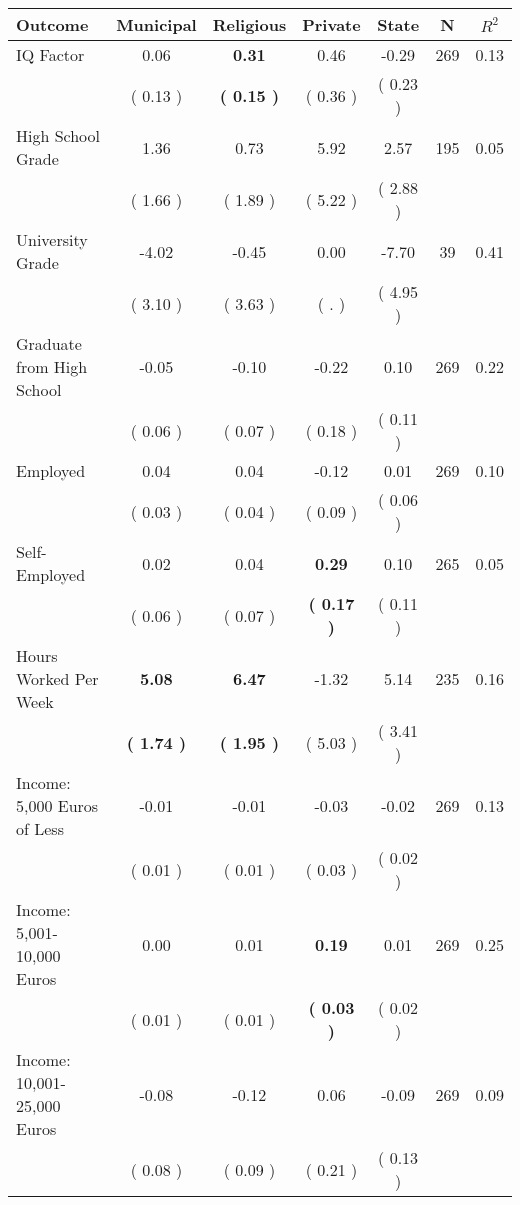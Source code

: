 \begin{tabular}{lcccccc}
\toprule
 \textbf{Outcome} & \textbf{Municipal} & \textbf{Religious} & \textbf{Private} & \textbf{State} & \textbf{N} & \textbf{$ R^2$} \\
\midrule
IQ Factor &      0.06 & \textbf{     0.31} &      0.46 &     -0.29 & 269 &      0.13 \\ 
 & (     0.13 ) & \textbf{(     0.15 )} & (     0.36 ) & (     0.23 ) & \\
High School Grade &      1.36 &      0.73 &      5.92 &      2.57 & 195 &      0.05 \\ 
 & (     1.66 ) & (     1.89 ) & (     5.22 ) & (     2.88 ) & \\
University Grade &     -4.02 &     -0.45 &      0.00 &     -7.70 & 39 &      0.41 \\ 
 & (     3.10 ) & (     3.63 ) & (        . ) & (     4.95 ) & \\
Graduate from High School &     -0.05 &     -0.10 &     -0.22 &      0.10 & 269 &      0.22 \\ 
 & (     0.06 ) & (     0.07 ) & (     0.18 ) & (     0.11 ) & \\
Employed &      0.04 &      0.04 &     -0.12 &      0.01 & 269 &      0.10 \\ 
 & (     0.03 ) & (     0.04 ) & (     0.09 ) & (     0.06 ) & \\
Self-Employed &      0.02 &      0.04 & \textbf{     0.29} &      0.10 & 265 &      0.05 \\ 
 & (     0.06 ) & (     0.07 ) & \textbf{(     0.17 )} & (     0.11 ) & \\
Hours Worked Per Week & \textbf{     5.08} & \textbf{     6.47} &     -1.32 &      5.14 & 235 &      0.16 \\ 
 & \textbf{(     1.74 )} & \textbf{(     1.95 )} & (     5.03 ) & (     3.41 ) & \\
Income: 5,000 Euros of Less &     -0.01 &     -0.01 &     -0.03 &     -0.02 & 269 &      0.13 \\ 
 & (     0.01 ) & (     0.01 ) & (     0.03 ) & (     0.02 ) & \\
Income: 5,001-10,000 Euros &      0.00 &      0.01 & \textbf{     0.19} &      0.01 & 269 &      0.25 \\ 
 & (     0.01 ) & (     0.01 ) & \textbf{(     0.03 )} & (     0.02 ) & \\
Income: 10,001-25,000 Euros &     -0.08 &     -0.12 &      0.06 &     -0.09 & 269 &      0.09 \\ 
 & (     0.08 ) & (     0.09 ) & (     0.21 ) & (     0.13 ) & \\

\end{tabular}
